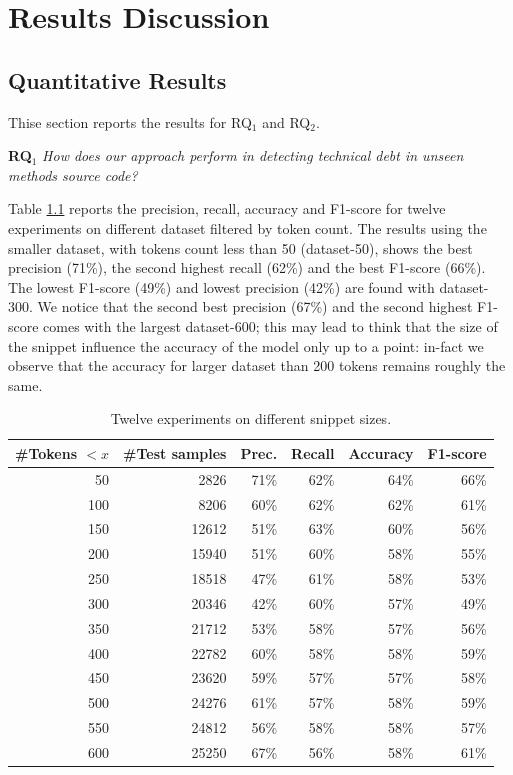 \chapter{Results Discussion}


\section{Quantitative Results}
Thise section reports the results for {RQ$_1$} and {RQ$_2$}.

\textbf{RQ$_1$} \textit{How does our approach perform in detecting technical debt in unseen methods source code?} 

Table \ref{tbl:rq1} reports the precision, recall, accuracy and F1-score for twelve experiments on different dataset filtered by token count. The results using the smaller dataset, with tokens count less than 50 (dataset-50), shows the best precision (71\%), the second highest recall (62\%) and the best F1-score (66\%). The lowest F1-score (49\%) and lowest precision (42\%) are found with dataset-300. We notice that the second best precision (67\%) and the second highest F1-score comes with the largest dataset-600; this may lead to think that the size of the snippet influence the accuracy of the model only up to a point: in-fact we observe that the accuracy for larger dataset than 200 tokens remains roughly the same.

\begin{table}[h!]
\centering
\caption{Twelve experiments on different snippet sizes.\label{tbl:rq1}}
\begin{tabular}{|r|r|r|r|r|r|}
\hline
\multicolumn{1}{|l|}{\#Tokens $< x$} &
  \multicolumn{1}{l|}{\#Test samples} &
  \multicolumn{1}{l|}{Prec.} &
  \multicolumn{1}{l|}{Recall} &
  \multicolumn{1}{l|}{Accuracy} &
  \multicolumn{1}{l|}{F1-score} \\ \hline
50  & 2826  & 71\% & 62\% & 64\% & 66\% \\ %
100 & 8206  & 60\% & 62\% & 62\% & 61\% \\
150 & 12612 & 51\% & 63\% & 60\% & 56\% \\
200 & 15940 & 51\% & 60\% & 58\% & 55\% \\ %
250 & 18518 & 47\% & 61\% & 58\% & 53\% \\
300 & 20346 & 42\% & 60\% & 57\% & 49\% \\
350 & 21712 & 53\% & 58\% & 57\% & 56\% \\
400 & 22782 & 60\% & 58\% & 58\% & 59\% \\ %
450 & 23620 & 59\% & 57\% & 57\% & 58\% \\
500 & 24276 & 61\% & 57\% & 58\% & 59\% \\
550 & 24812 & 56\% & 58\% & 58\% & 57\% \\
600 & 25250 & 67\% & 56\% & 58\% & 61\% \\
\hline
\end{tabular}
\end{table}


